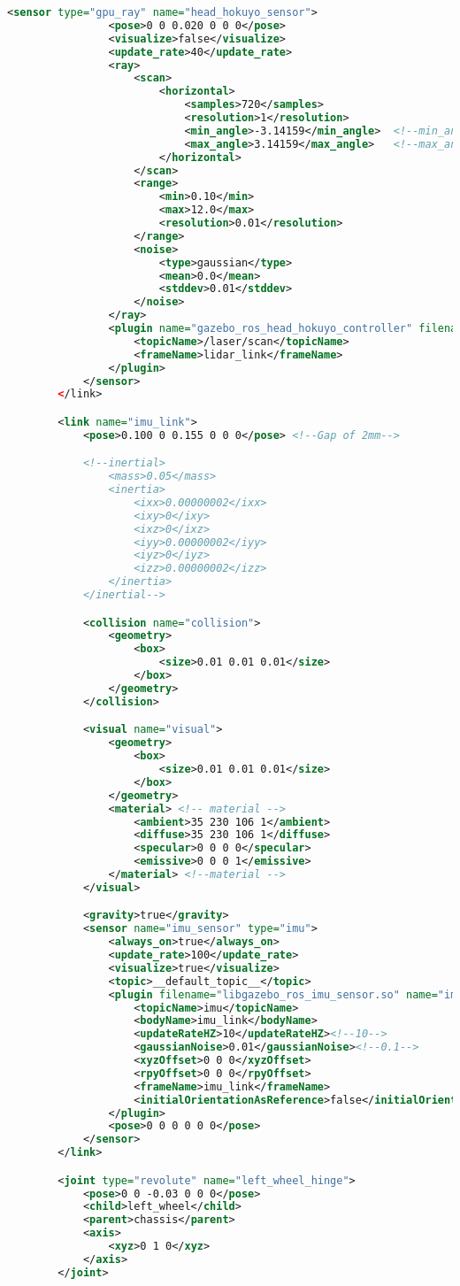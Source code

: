 \begin{appendices}
\begin{lstlisting}[language=XML]
			<sensor type="gpu_ray" name="head_hokuyo_sensor">
				<pose>0 0 0.020 0 0 0</pose>
				<visualize>false</visualize>
				<update_rate>40</update_rate>
				<ray>
					<scan>
						<horizontal>
							<samples>720</samples>
							<resolution>1</resolution>
							<min_angle>-3.14159</min_angle>  <!--min_angle>-1.570796</min_angle-->
							<max_angle>3.14159</max_angle>   <!--max_angle>1.570796</max_angle-->
						</horizontal>
					</scan>
					<range>
						<min>0.10</min>
						<max>12.0</max>
						<resolution>0.01</resolution>
					</range>
					<noise>
						<type>gaussian</type>
						<mean>0.0</mean>
						<stddev>0.01</stddev>
					</noise>
				</ray>
				<plugin name="gazebo_ros_head_hokuyo_controller" filename="libgazebo_ros_gpu_laser.so">
					<topicName>/laser/scan</topicName>
					<frameName>lidar_link</frameName>
				</plugin>
			</sensor>
		</link>

		<link name="imu_link">
			<pose>0.100 0 0.155 0 0 0</pose> <!--Gap of 2mm-->

			<!--inertial>
				<mass>0.05</mass>
				<inertia>
					<ixx>0.00000002</ixx>
					<ixy>0</ixy>
					<ixz>0</ixz>
					<iyy>0.00000002</iyy>
					<iyz>0</iyz>
					<izz>0.00000002</izz>
				</inertia>
			</inertial-->

			<collision name="collision">
				<geometry>
					<box>
						<size>0.01 0.01 0.01</size>
					</box>
				</geometry>
			</collision>

			<visual name="visual">
				<geometry>
					<box>
						<size>0.01 0.01 0.01</size>
					</box>
				</geometry>
				<material> <!-- material -->
					<ambient>35 230 106 1</ambient>
					<diffuse>35 230 106 1</diffuse>
					<specular>0 0 0 0</specular>
					<emissive>0 0 0 1</emissive>
				</material> <!--material -->
			</visual>

			<gravity>true</gravity>
			<sensor name="imu_sensor" type="imu">
				<always_on>true</always_on>
				<update_rate>100</update_rate>
				<visualize>true</visualize>
				<topic>__default_topic__</topic>
				<plugin filename="libgazebo_ros_imu_sensor.so" name="imu_plugin">
					<topicName>imu</topicName>
					<bodyName>imu_link</bodyName>
					<updateRateHZ>10</updateRateHZ><!--10-->
					<gaussianNoise>0.01</gaussianNoise><!--0.1-->
					<xyzOffset>0 0 0</xyzOffset>
					<rpyOffset>0 0 0</rpyOffset>
					<frameName>imu_link</frameName>
					<initialOrientationAsReference>false</initialOrientationAsReference>
				</plugin>
				<pose>0 0 0 0 0 0</pose>
			</sensor>
		</link>

		<joint type="revolute" name="left_wheel_hinge">
			<pose>0 0 -0.03 0 0 0</pose>
			<child>left_wheel</child>
			<parent>chassis</parent>
			<axis>
				<xyz>0 1 0</xyz>
			</axis>
		</joint>


\end{lstlisting}
\end{appendices}
